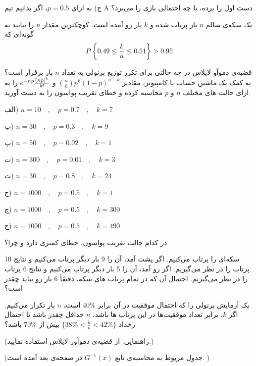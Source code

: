 ج) به ازای $p=0.5$، اگر بدانیم تیم A دست اول را برده، با چه احتمالی بازی را می‌برد؟


\Q
یک سکه‌ی سالم $n$ بار پرتاب شده و $k$ بار رو آمده است. کوچکترین مقدار $n$ را بیابید به گونه‌ای که
$$
P\left\{0.49\le{k\over n}\le0.51\right\}>0.95
$$


\Q
قضیه‌ی دموآو-لاپلاس در چه حالتی برای تکرر توزیع برنولی به تعداد $n$ بار برقرار است؟ به کمک یک ماشین حساب یا کامپیوتر، مقادیر 
$\binom{n}{k}p^k(1-p)^{n-k}$
و
$e^{-np}{(np)^k\over k!}$
 را به ازای حالت های مختلف 
$n$
و
$p$
محاسبه کرده و خطای تقریب پواسون را به دست آورید.

الف)
$n=10\quad,\quad p=0.7\quad,\quad k=7$

ب)
$n=30\quad,\quad p=0.3\quad,\quad k=9$

پ)
$n=50\quad,\quad p=0.02\quad,\quad k=1$

ت)
$n=300\quad,\quad p=0.01\quad,\quad k=3$

ث)
$n=30\quad,\quad p=0.8\quad,\quad k=24$

ج)
$n=1000\quad,\quad p=0.5\quad,\quad k=1$

چ)
$n=1000\quad,\quad p=0.5\quad,\quad k=300$

ح)
$n=1000\quad,\quad p=0.5\quad,\quad k=490$

در کدام حالت تقریب پواسون، خطای کمتری دارد و چرا؟


\Q
سکه‌ای را پرتاب می‌کنیم. اگر پشت آمد، آن را 9 بار دیگر پرتاب می‌کنیم و نتایج 10 پرتاب را در نظر می‌گیریم. اگر رو آمد، آن را 5 بار دیگر پرتاب می‌کنیم و نتایج 6 پرتاب را در نظر می‌گیریم. احتمال آن که در تمام پرتاب های سکه، دقیقأ 6 بار رو بیاید چقدر است؟


\Q
یک آزمایش برنولی را که احتمال موفقیت در آن برابر 
$
40\%
$
است، $n$ بار تکرار می‌کنیم. اگر $k$، برابر تعداد موفقیت‌ها در این پرتاب ها باشد، $n$ حداقل چقدر باشد تا احتمال رخداد 
$
\{38\%<\frac{k}{n}<42\%\}
$
بیش از 
$
70\%
$
باشد؟

(راهنمایی: از قضیه‌ی دموآور-لاپلاس استفاده نمایید.)

(جدول مربوط به محاسبه‌ی تابع 
$
G^{-1}(x)
$
در صفحه‌ی بعد آمده است.
)

\newpage


